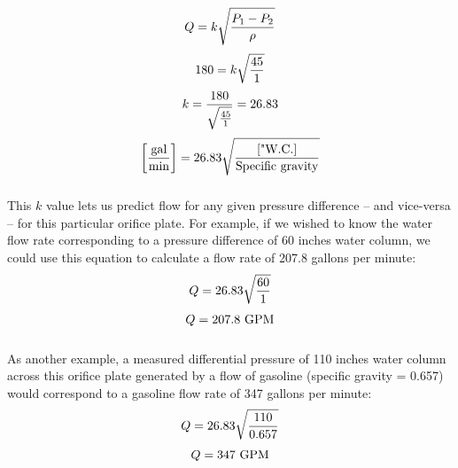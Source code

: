 \documentclass{beamer}
\begin{document}
\begin{frame}
	\frametitle{}

	


%
%
$$Q = k \sqrt{{P_1 - P_2} \over \rho}$$
%
$$180 = k \sqrt{{45} \over 1}$$
%
$$k = {180 \over \sqrt{45 \over 1}} = 26.83$$
%
%
$$\left[\hbox{gal} \over \hbox{min}\right] = 26.83 \sqrt{\left[\hbox{"W.C.}\right] \over \hbox{Specific gravity}}$$
%
\end{frame}
\begin{frame}
	\frametitle{}

	



This $k$ value lets us predict flow for any given pressure difference -- and vice-versa -- for this particular orifice plate.  For example, if we wished to know the water flow rate corresponding to a pressure difference of 60 inches water column, we could use this equation to calculate a flow rate of 207.8 gallons per minute:
%
$$Q = 26.83 \sqrt{60 \over 1}$$
%
$$Q = 207.8 \hbox{ GPM}$$
%
\end{frame}
\begin{frame}
	\frametitle{}

	



As another example, a measured differential pressure of 110 inches water column across this orifice plate generated by a flow of gasoline (specific gravity = 0.657) would correspond to a gasoline flow rate of 347 gallons per minute:
%
$$Q = 26.83 \sqrt{110 \over 0.657}$$
%
$$Q = 347 \hbox{ GPM}$$
%
\end{frame}
%
\end{document}
